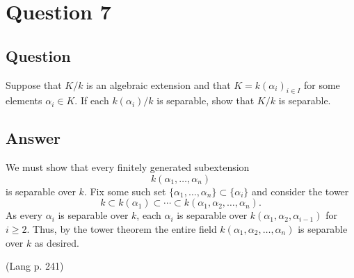 \documentclass[11pt]{article}
\begin{document}
\section{Question 7}
\subsection{Question}
Suppose that $K/k$ is an algebraic extension and that $K=k(\alpha_i)_{i \in I}$ for some elements $\alpha_i \in K$. If each $k(\alpha_i)/k$ is separable, show that $K/k$ is separable. 
\subsection{Answer}
We must show that every finitely generated subextension
\[k(\alpha_1,\dots, \alpha_n)\]
is separable over $k$. Fix some such set $\{ \alpha_1, \dots, \alpha_n\} \subset \{\alpha_i\}$ and consider the tower
\[k \subset k(\alpha_1) \subset \cdots \subset k(\alpha_1,\alpha_2, \dots, \alpha_n).\]
As every  $\alpha_i$ is separable over $k$, each $\alpha_i$ is separable over $k(\alpha_1, \alpha_2, \alpha_{i-1})$  for $i \geq 2$. Thus, by the tower theorem the entire field $k(\alpha_1, \alpha_2, \dots, \alpha_n)$ is separable over $k$ as desired.

(Lang p. 241)
\end{document}

